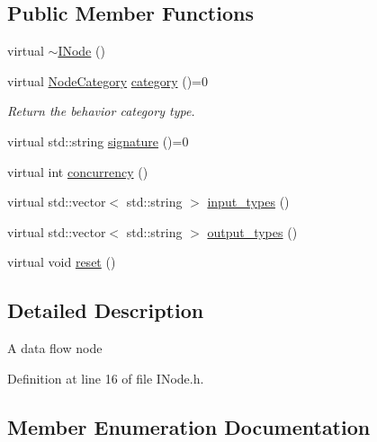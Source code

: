 \subsection*{Public Member Functions}
\begin{DoxyCompactItemize}
\item 
virtual \hyperlink{class_wire_cell_1_1_i_node_a38004973c3bcb18b6783cc47a75339d9}{$\sim$\+I\+Node} ()
\item 
virtual \hyperlink{class_wire_cell_1_1_i_node_a5546e64cbb70bd3ac787295cac9ac803}{Node\+Category} \hyperlink{class_wire_cell_1_1_i_node_a58c07f15b165e5fb33bbc7b2e047b39b}{category} ()=0
\begin{DoxyCompactList}\small\item\em Return the behavior category type. \end{DoxyCompactList}\item 
virtual std\+::string \hyperlink{class_wire_cell_1_1_i_node_a0b0763465adf5ba7febe8e378162b584}{signature} ()=0
\item 
virtual int \hyperlink{class_wire_cell_1_1_i_node_a87d2b7293da4f6955e389ac6a2011306}{concurrency} ()
\item 
virtual std\+::vector$<$ std\+::string $>$ \hyperlink{class_wire_cell_1_1_i_node_ae13fc140c8e815fac9327dfa5b43f853}{input\+\_\+types} ()
\item 
virtual std\+::vector$<$ std\+::string $>$ \hyperlink{class_wire_cell_1_1_i_node_aba7e537684cb4f2453796ff73da2d602}{output\+\_\+types} ()
\item 
virtual void \hyperlink{class_wire_cell_1_1_i_node_a7bf4dfff146b72f866ab25f7662c56a0}{reset} ()
\end{DoxyCompactItemize}


\subsection{Detailed Description}
A data flow node 

Definition at line 16 of file I\+Node.\+h.



\subsection{Member Enumeration Documentation}
\mbox{\label{class_wire_cell_1_1_i_node_a5546e64cbb70bd3ac787295cac9ac803}} 
